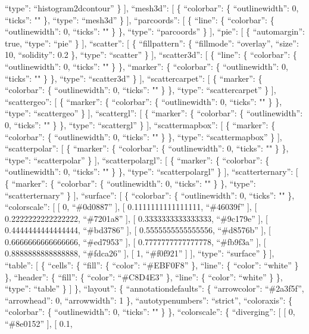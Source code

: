 \documentclass[
]{article}
\begin{document}
``type'': ``histogram2dcontour'' \} {]}, ``mesh3d'': {[} \{
``colorbar'': \{ ``outlinewidth'': 0, ``ticks'': "" \}, ``type'':
``mesh3d'' \} {]}, ``parcoords'': {[} \{ ``line'': \{ ``colorbar'': \{
``outlinewidth'': 0, ``ticks'': "" \} \}, ``type'': ``parcoords'' \}
{]}, ``pie'': {[} \{ ``automargin'': true, ``type'': ``pie'' \} {]},
``scatter'': {[} \{ ``fillpattern'': \{ ``fillmode'': ``overlay'',
``size'': 10, ``solidity'': 0.2 \}, ``type'': ``scatter'' \} {]},
``scatter3d'': {[} \{ ``line'': \{ ``colorbar'': \{ ``outlinewidth'': 0,
``ticks'': "" \} \}, ``marker'': \{ ``colorbar'': \{ ``outlinewidth'':
0, ``ticks'': "" \} \}, ``type'': ``scatter3d'' \} {]},
``scattercarpet'': {[} \{ ``marker'': \{ ``colorbar'': \{
``outlinewidth'': 0, ``ticks'': "" \} \}, ``type'': ``scattercarpet'' \}
{]}, ``scattergeo'': {[} \{ ``marker'': \{ ``colorbar'': \{
``outlinewidth'': 0, ``ticks'': "" \} \}, ``type'': ``scattergeo'' \}
{]}, ``scattergl'': {[} \{ ``marker'': \{ ``colorbar'': \{
``outlinewidth'': 0, ``ticks'': "" \} \}, ``type'': ``scattergl'' \}
{]}, ``scattermapbox'': {[} \{ ``marker'': \{ ``colorbar'': \{
``outlinewidth'': 0, ``ticks'': "" \} \}, ``type'': ``scattermapbox'' \}
{]}, ``scatterpolar'': {[} \{ ``marker'': \{ ``colorbar'': \{
``outlinewidth'': 0, ``ticks'': "" \} \}, ``type'': ``scatterpolar'' \}
{]}, ``scatterpolargl'': {[} \{ ``marker'': \{ ``colorbar'': \{
``outlinewidth'': 0, ``ticks'': "" \} \}, ``type'': ``scatterpolargl''
\} {]}, ``scatterternary'': {[} \{ ``marker'': \{ ``colorbar'': \{
``outlinewidth'': 0, ``ticks'': "" \} \}, ``type'': ``scatterternary''
\} {]}, ``surface'': {[} \{ ``colorbar'': \{ ``outlinewidth'': 0,
``ticks'': "" \}, ``colorscale'': {[} {[} 0, ``\#0d0887'' {]}, {[}
0.1111111111111111, ``\#46039f'' {]}, {[} 0.2222222222222222,
``\#7201a8'' {]}, {[} 0.3333333333333333, ``\#9c179e'' {]}, {[}
0.4444444444444444, ``\#bd3786'' {]}, {[} 0.5555555555555556,
``\#d8576b'' {]}, {[} 0.6666666666666666, ``\#ed7953'' {]}, {[}
0.7777777777777778, ``\#fb9f3a'' {]}, {[} 0.8888888888888888,
``\#fdca26'' {]}, {[} 1, ``\#f0f921'' {]} {]}, ``type'': ``surface'' \}
{]}, ``table'': {[} \{ ``cells'': \{ ``fill'': \{ ``color'':
``\#EBF0F8'' \}, ``line'': \{ ``color'': ``white'' \} \}, ``header'': \{
``fill'': \{ ``color'': ``\#C8D4E3'' \}, ``line'': \{ ``color'':
``white'' \} \}, ``type'': ``table'' \} {]} \}, ``layout'': \{
``annotationdefaults'': \{ ``arrowcolor'': ``\#2a3f5f'', ``arrowhead'':
0, ``arrowwidth'': 1 \}, ``autotypenumbers'': ``strict'', ``coloraxis'':
\{ ``colorbar'': \{ ``outlinewidth'': 0, ``ticks'': "" \} \},
``colorscale'': \{ ``diverging'': {[} {[} 0, ``\#8e0152'' {]}, {[} 0.1,
\end{document}
